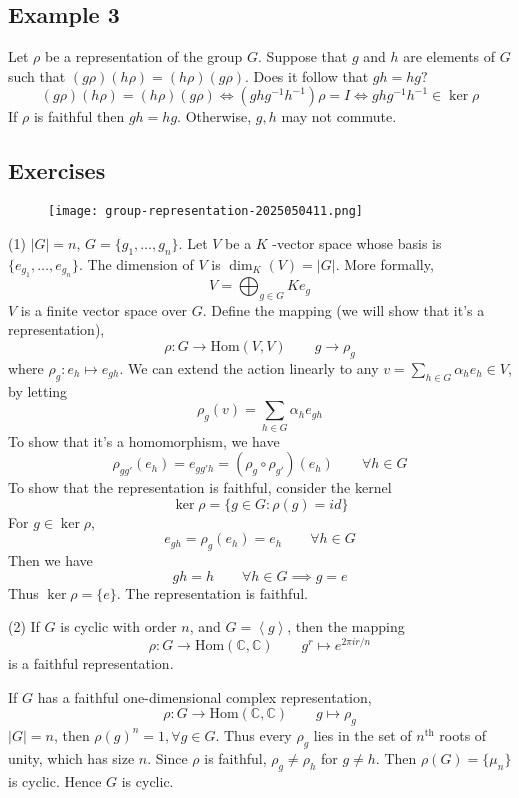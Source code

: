 \subsection{Example 3}

Let $\rho$ be a representation of the group $G$. Suppose that $g$ and $h$ are elements of $G$ such that $(g \rho)(h \rho)=(h \rho)(g \rho)$. Does it follow that $g h=h g ?$
\[
(g \rho)(h \rho)=(h \rho)(g \rho)\iff (ghg^{-1}h^{-1})\rho=I\iff ghg^{-1}h^{-1}\in \ker \rho
\]
If $\rho$ is faithful then $gh=hg$. Otherwise, $g,h$ may not commute.

\subsection{Exercises}

\begin{exercise}[Yau-2024]
\begin{figure}[H]
\centering
\texttt{[image: group-representation-2025050411.png]}
\label{}
\end{figure}
\end{exercise}
(1)
$\lvert G \rvert=n$, $G=\{ g_1,\dots,g_n \}$. Let $V$ be a $K$ -vector space whose basis is $\{ e_{g_1},\dots,e_{g_n} \}$. The dimension of $V$ is $\dim_{K}(V)=\lvert G \rvert$. More formally,
\[
V=\bigoplus_{g\in G}Ke_{g}
\]
$V$ is a finite vector space over $G$. Define the mapping (we will show that it's a representation),
\[
\rho:G\to \mathrm{Hom}(V,V)\qquad g\to \rho_{g}
\]
where $\rho_{g}: e_{h}\mapsto e_{gh}$. We can extend the action linearly to any $v=\sum_{h\in G}^{}\alpha_{h}e_{h}\in V$, by letting
\[
\rho_{g}(v)=\sum_{h\in G}\alpha_{h}e_{gh}
\]
To show that it's a homomorphism, we have
\[
\rho_{gg'}(e_{h})=e_{gg'h}=(\rho_{g}\circ \rho_{g'})(e_{h})\qquad \forall h\in G
\]
To show that the representation is faithful, consider the kernel
\[
\ker \rho=\{ g\in G:\rho(g)=id \}
\]
For $g\in \ker \rho$,
\[
e_{gh}=\rho_{g}(e_{h})=e_{h}\qquad \forall h\in G
\]
Then we have
\[
gh=h\qquad \forall h\in G\implies g=e
\]
Thus $\ker \rho=\{ e \}$. The representation is faithful.

(2)
If $G$ is cyclic with order $n$, and $G= \left< g \right>$, then the mapping
\[
\rho:G\to \mathrm{Hom}(\mathbb{C},\mathbb{C})\qquad g^{r}\mapsto e^{ 2\pi ir/n }
\]
is a faithful representation.

If $G$ has a faithful one-dimensional complex representation,
\[
\rho:G\to \mathrm{Hom}(\mathbb{C},\mathbb{C})\qquad g\mapsto \rho_{g}
\]
$\lvert G \rvert=n$, then $\rho (g)^{n}=1,\forall g\in G$. Thus every $\rho_{g}$ lies in the set of $n^{\text{th}}$ roots of unity, which has size $n$. Since $\rho$ is faithful, $\rho_{g}\neq \rho_{h}$ for $g\neq h$. Then $\rho(G)=\{ \mu _n \}$ is cyclic. Hence $G$ is cyclic.

